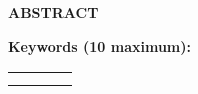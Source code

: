\newpage
\pagestyle{nonumber}

\begin{center}
    \textbf{
        ABSTRACT
    }
    \\[\baselineskip]
\end{center}

\begin{center}
    \setlength{}
\end{center}

\vspace{0.3cm}
\textbf{Keywords (10 maximum):}
\begin{center}
    \renewcommand{\arraystretch}{1.5}\begin{tabular}{|m{}|m{}|m{}|m{}|}
        \hline
            \centering\arraybackslash{?} & \centering\arraybackslash{?} & \centering\arraybackslash{?} & \centering\arraybackslash{?} \\
        \hline
        \centering\arraybackslash{?} & \centering\arraybackslash{?} & \centering\arraybackslash{?} & \centering\arraybackslash{?} \\
        \hline
        \centering\arraybackslash{?} & \centering\arraybackslash{?} \\
        \cline{1-2}
    \end{tabular}
\end{center}
